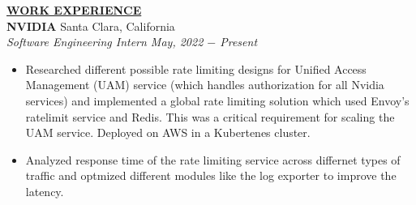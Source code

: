 \documentclass{article}
\begin{document}
% 
%
\noindent \textbf{\underline{WORK EXPERIENCE}} \\
\noindent \textbf{NVIDIA} \hfill Santa Clara, California\\
\textit{Software Engineering Intern \hfill May, 2022 $-$ Present}
\begin{itemize}[noitemsep,nolistsep,leftmargin=*]
	\item Researched different possible rate limiting designs for Unified Access Management (UAM) service (which handles authorization for all Nvidia services) and implemented a global rate limiting solution which used Envoy's ratelimit service and Redis. This was a critical requirement for scaling the UAM service. Deployed on AWS in a Kubertenes cluster.
	\item Analyzed response time of the rate limiting service across differnet types of traffic and optmized different modules like the log exporter to improve the latency.\\
\end{itemize}
\end{document}
